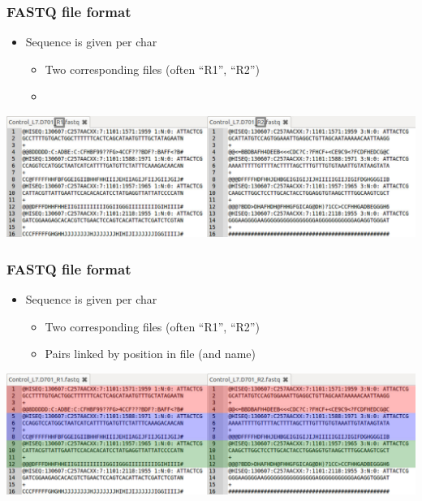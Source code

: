 \documentclass{beamer}			  %
\begin{document}
\begin{frame}
	\frametitle{FASTQ file format}
	\begin{itemize}
		\item Sequence is given per char
		\begin{itemize}
			\item Two corresponding files (often ``R1”, ``R2”)
			\item[ ] \quad
		\end{itemize}
	\end{itemize}
	\begin{center}
		\includegraphics[width=\textwidth]{figures/dge_03ap.png}
	\end{center}
\end{frame}

\begin{frame}
	\frametitle{FASTQ file format}
	\begin{itemize}
		\item Sequence is given per char
		\begin{itemize}
			\item Two corresponding files (often ``R1”, ``R2”)
			\item Pairs linked by position in file (and name)
		\end{itemize}
	\end{itemize}
	\begin{center}
		\includegraphics[width=\textwidth]{figures/dge_03bp.png}
	\end{center}
\end{frame}
\end{document}
